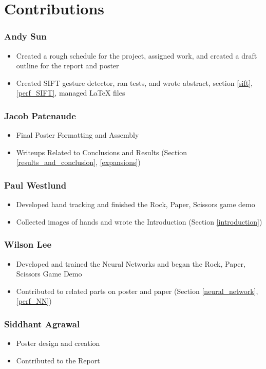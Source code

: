 \section{Contributions}

\subsubsection*{Andy Sun}
\begin{itemize}
\item Created a rough schedule for the project, assigned work, and created a draft outline for the report and poster
\item Created SIFT gesture detector, ran tests, and wrote abstract, section \ref{sift}, \ref{perf_SIFT}, managed \LaTeX{} files
\end{itemize}

\subsubsection*{Jacob Patenaude}
\begin{itemize}
\item Final Poster Formatting and Assembly
\item Writeups Related to Conclusions and Results (Section \ref{results_and_conclusion}, \ref{expansions})
\end{itemize}

\subsubsection*{Paul Westlund}
\begin{itemize}
\item Developed hand tracking and finished the Rock, Paper, Scissors game demo
\item Collected images of hands and wrote the Introduction (Section \ref{introduction})
\end{itemize}

\subsubsection*{Wilson Lee}
\begin{itemize}
\item Developed and trained the Neural Networks and began the Rock, Paper, Scissors Game Demo
\item Contributed to related parts on poster and paper (Section \ref{neural_network}, \ref{perf_NN})
\end{itemize}

\subsubsection*{Siddhant Agrawal}
\begin{itemize}
\item Poster design and creation
\item Contributed to the Report
\end{itemize}